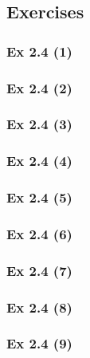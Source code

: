 \subsection{Exercises}\label{sec:2.4_Exercises}

\subsubsection{Ex 2.4 (1)}\label{sec:Ex_2.4.1}

\subsubsection{Ex 2.4 (2)}\label{sec:Ex_2.4.2}

\subsubsection{Ex 2.4 (3)}\label{sec:Ex_2.4.3}

\subsubsection{Ex 2.4 (4)}\label{sec:Ex_2.4.4}

\subsubsection{Ex 2.4 (5)}\label{sec:Ex_2.4.5}

\subsubsection{Ex 2.4 (6)}\label{sec:Ex_2.4.6}

\subsubsection{Ex 2.4 (7)}\label{sec:Ex_2.4.7}

\subsubsection{Ex 2.4 (8)}\label{sec:Ex_2.4.8}

\subsubsection{Ex 2.4 (9)}\label{sec:Ex_2.4.9}

